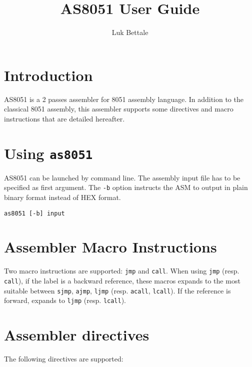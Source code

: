 \documentclass{article}
\title{AS8051 User Guide}
\author{Luk Bettale}
\date{}
\begin{document}
\maketitle

\section*{Introduction}
AS8051 is a 2 passes assembler for 8051 assembly language. In addition
to the classical 8051 assembly, this assembler supports some
directives and macro instructions that are detailed hereafter.

\section*{Using \texttt{as8051}}
AS8051 can be launched by command line. The assembly input file has to
be specified as first argument. The \texttt{-b} option instructs the
ASM to output in plain binary format instead of HEX format.

\begin{verbatim}
as8051 [-b] input
\end{verbatim}

\section*{Assembler Macro Instructions}
Two macro instructions are supported: \texttt{jmp} and
\texttt{call}. When using \texttt{jmp} (resp. \texttt{call}), if the
label is a backward reference, these macros expands to the most
suitable between \texttt{sjmp}, \texttt{ajmp}, \texttt{ljmp}
(resp. \texttt{acall}, \texttt{lcall}). If the reference is forward,
expands to \texttt{ljmp} (resp. \texttt{lcall}).

\section*{Assembler directives}
The following directives are supported:
\end{document}

